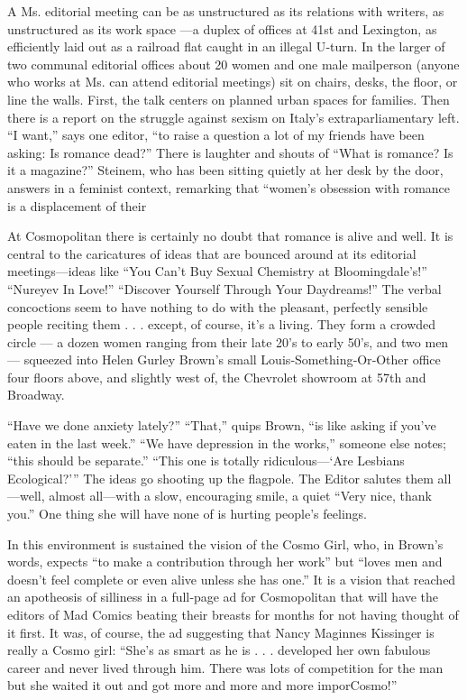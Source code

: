 A Ms. editorial meeting can be as unstructured as its relations with
writers, as unstructured as its work space ---a duplex of offices at
41st and Lexington, as efficiently laid out as a railroad flat caught in
an illegal U‐turn. In the larger of two communal editorial offices about
20 women and one male mailperson (anyone who works at Ms. can attend
editorial meetings) sit on chairs, desks, the floor, or line the walls.
First, the talk centers on planned urban spaces for families. Then there
is a report on the struggle against sexism on Italy's extraparliamentary
left. ``I want,'' says one editor, ``to raise a question a lot of my
friends have been asking: Is romance dead?'' There is laughter and
shouts of ``What is romance? Is it a magazine?'' Steinem, who has been
sitting quietly at her desk by the door, answers in a feminist context,
remarking that ``women's obsession with romance is a displacement of
their

At Cosmopolitan there is certainly no doubt that romance is alive and
well. It is central to the caricatures of ideas that are bounced around
at its editorial meetings---ideas like ``You Can't Buy Sexual Chemistry
at Bloomingdale's!'' ``Nureyev In Love!'' ``Discover Yourself Through
Your Daydreams!'' The verbal concoctions seem to have nothing to do with
the pleasant, perfectly sensible people reciting them . . . except, of
course, it's a living. They form a crowded circle --- a dozen women
ranging from their late 20's to early 50's, and two men --- squeezed
into Helen Gurley Brown's small Louis‐Something‐Or‐Other office four
floors above, and slightly west of, the Chevrolet showroom at 57th and
Broadway.

``Have we done anxiety lately?'' ``That,'' quips Brown, ``is like asking
if you've eaten in the last week.'' ``We have depression in the works,''
someone else notes; ``this should be separate.'' ``This one is totally
ridiculous---`Are Lesbians Ecological?''' The ideas go shooting up the
flagpole. The Editor salutes them all---well, almost all---with a slow,
encouraging smile, a quiet ``Very nice, thank you.'' One thing she will
have none of is hurting people's feelings.

In this environment is sustained the vision of the Cosmo Girl, who, in
Brown's words, expects ``to make a contribution through her work'' but
``loves men and doesn't feel complete or even alive unless she has
one.'' It is a vision that reached an apotheosis of silliness in a
full‐page ad for Cosmopolitan that will have the editors of Mad Comics
beating their breasts for months for not having thought of it first. It
was, of course, the ad suggesting that Nancy Maginnes Kissinger is
really a Cosmo girl: ``She's as smart as he is . . . developed her own
fabulous career and never lived through him. There was lots of
competition for the man but she waited it out and got more and more and
more imporCosmo!''

